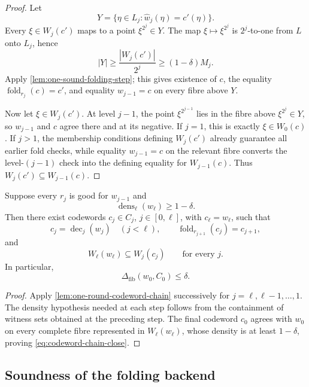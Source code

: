 \begin{proof}
Let
\[
  Y=\{\eta\in L_j:\widehat w_j(\eta)=c'(\eta)\}.
\]
Every $\xi\in W_j(c')$ maps to a point $\xi^{2^j}\in Y$.  The map $\xi\mapsto\xi^{2^j}$ is $2^j$-to-one from $L$ onto $L_j$, hence
\[
  |Y|\ge\frac{|W_j(c')|}{2^j}
  \ge(1-\delta)M_j.
\]
Apply \cref{lem:one-sound-folding-step}; this gives existence of $c$, the equality $\operatorname{fold}_{r_j}(c)=c'$, and equality $w_{j-1}=c$ on every fibre above $Y$.

Now let $\xi\in W_j(c')$.  At level $j-1$, the point $\xi^{2^{j-1}}$ lies in the fibre above $\xi^{2^j}\in Y$, so $w_{j-1}$ and $c$ agree there and at its negative.  If $j=1$, this is exactly $\xi\in W_0(c)$.  If $j>1$, the membership conditions defining $W_j(c')$ already guarantee all earlier fold checks, while equality $w_{j-1}=c$ on the relevant fibre converts the level-$(j-1)$ check into the defining equality for $W_{j-1}(c)$.  Thus $W_j(c')\subseteq W_{j-1}(c)$.
\end{proof}

\begin{proposition}
\label{prop:codeword-chain}
Suppose every $r_j$ is good for $w_{j-1}$ and
\[
  \operatorname{dens}_\ell(w_\ell)\ge1-\delta.
\]
Then there exist codewords $c_j\in C_j$, $j\in[0,\ell]$, with $c_\ell=w_\ell$, such that
\[
  c_j=\operatorname{dec}_j(w_j)
  \quad (j<\ell),
  \qquad
  \operatorname{fold}_{r_{j+1}}(c_j)=c_{j+1},
\]
and
\[
  W_\ell(w_\ell)\subseteq W_j(c_j)
  \qquad\text{for every }j.
\]
In particular,
\begin{equation}
  \Delta_{\mathrm{fib}}(w_0,C_0)\le\delta.
  \label{eq:codeword-chain-close}
\end{equation}
\end{proposition}

\begin{proof}
Apply \cref{lem:one-round-codeword-chain} successively for $j=\ell,\ell-1,\ldots,1$.  The density hypothesis needed at each step follows from the containment of witness sets obtained at the preceding step.  The final codeword $c_0$ agrees with $w_0$ on every complete fibre represented in $W_\ell(w_\ell)$, whose density is at least $1-\delta$, proving \eqref{eq:codeword-chain-close}.
\end{proof}

\subsection{Soundness of the folding backend}
\label{sec:folding-soundness}

